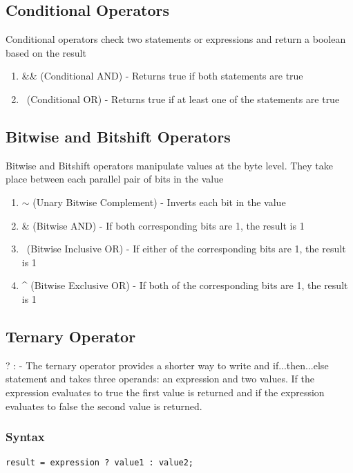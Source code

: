 \documentclass[a4paper]{article}
\begin{document}
\subsection*{Conditional Operators}
Conditional operators check two statements or expressions and return a boolean
based on the result
\begin{enumerate}

\item \&\& (Conditional AND) - Returns true if both statements are true

\item \textbar\textbar \ (Conditional OR) - Returns true if at least one of the statements are
true

\end{enumerate}

\subsection*{Bitwise and Bitshift Operators}
Bitwise and Bitshift operators manipulate values at the byte level. They take
place between each parallel pair of bits in the value
\begin{enumerate}

\item $\sim$ (Unary Bitwise Complement) - Inverts each bit in the value

\item \& (Bitwise AND) - If both corresponding bits are 1, the result is 1

\item \textbar \ (Bitwise Inclusive OR) - If either of the corresponding bits are 1, the
result is 1

\item \string^ (Bitwise Exclusive OR) - If both of the corresponding bits are 1,
the result is 1

\end{enumerate}

\subsection*{Ternary Operator}
? : - The ternary operator provides a shorter way to write and if...then...else
statement and takes three operands: an expression and two values. If the
expression evaluates to true the first value is returned and if the expression
evaluates to false the second value is returned.

\subsubsection*{Syntax}
\begin{lstlisting}
result = expression ? value1 : value2;
\end{lstlisting}
\end{document}
